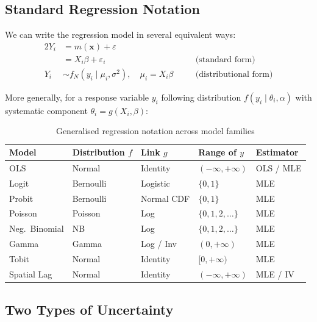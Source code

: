 \subsection{Standard Regression Notation}

We can write the regression model in several equivalent ways:
\begin{alignat*}{2}
  Y_i &= m(\mathbf{x}) + \varepsilon && \\
      &= X_i\beta + \varepsilon_i && \quad\text{(standard form)} \\
  Y_i &\sim f_N(y_i \mid \mu_i, \sigma^2), \quad \mu_i = X_i\beta
    && \quad\text{(distributional form)}
\end{alignat*}

More generally, for a response variable $y_i$ following distribution
$f(y_i \mid \theta_i, \alpha)$ with systematic component $\theta_i =
g(X_i, \beta)$:

\begin{table}[htp]
\centering
\caption{Generalised regression notation across model families}
\label{tbl_RegNotation}
\renewcommand{\arraystretch}{1.4}
\begin{tabular}{@{}lllll@{}}
\toprule
\textbf{Model} & \textbf{Distribution} $f$ & \textbf{Link} $g$ &
\textbf{Range of $y$} & \textbf{Estimator} \\
\midrule
OLS          & Normal    & Identity  & $(-\infty, +\infty)$ & OLS / MLE \\
Logit        & Bernoulli & Logistic  & $\{0,1\}$             & MLE \\
Probit       & Bernoulli & Normal CDF & $\{0,1\}$            & MLE \\
Poisson      & Poisson   & Log       & $\{0,1,2,\ldots\}$   & MLE \\
Neg.\ Binomial & NB      & Log       & $\{0,1,2,\ldots\}$   & MLE \\
Gamma        & Gamma     & Log / Inv & $(0,+\infty)$         & MLE \\
Tobit        & Normal    & Identity  & $[0,+\infty)$         & MLE \\
Spatial Lag  & Normal    & Identity  & $(-\infty,+\infty)$   & MLE / IV \\
\bottomrule
\end{tabular}
\renewcommand{\arraystretch}{1}
\end{table}

\subsection{Two Types of Uncertainty}

